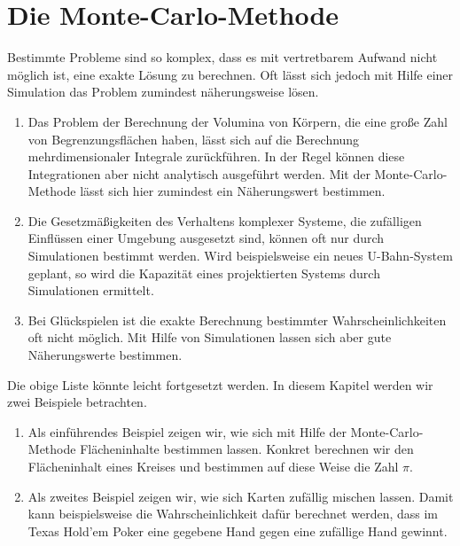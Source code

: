 \chapter[Monte-Carlo Method]{Die Monte-Carlo-Methode}
Bestimmte Probleme sind so komplex, dass es mit vertretbarem Aufwand nicht m\"oglich ist, eine exakte L\"osung zu
berechnen.  Oft l\"asst sich jedoch mit Hilfe einer Simulation das Problem zumindest n\"aherungsweise l\"osen.  
\begin{enumerate}
\item Das Problem der Berechnung der Volumina von K\"orpern, die eine gro{\ss}e Zahl von Begrenzungsfl\"achen haben,
      l\"asst sich auf die Berechnung mehrdimensionaler Integrale zur\"uckf\"uhren.  In der Regel k\"onnen diese
      Integrationen aber nicht analytisch ausgef\"uhrt werden.   Mit der Monte-Carlo-Methode l\"asst sich hier
      zumindest ein N\"aherungswert bestimmen.
\item Die Gesetzm\"a{\ss}igkeiten des Verhaltens komplexer Systeme, die zuf\"alligen Ein\-fl\"ussen einer Umgebung
      ausgesetzt sind, k\"onnen oft nur durch Simulationen bestimmt werden.  Wird beispielsweise ein neues
      U-Bahn-System geplant, so wird die Kapazit\"at eines projektierten Systems durch Simulationen ermittelt.
\item Bei Gl\"uckspielen ist die exakte Berechnung bestimmter Wahrscheinlichkeiten oft nicht m\"oglich.
      Mit Hilfe von Simulationen lassen sich aber gute N\"aherungs\-werte bestimmen.  
\end{enumerate}
Die obige Liste k\"onnte leicht fortgesetzt werden.  In diesem Kapitel werden wir zwei Beispiele betrachten.
\begin{enumerate}
\item Als einf\"uhrendes Beispiel zeigen wir, wie sich mit Hilfe der Monte-Carlo-Methode Fl\"acheninhalte bestimmen
      lassen.  Konkret berechnen wir den Fl\"a\-cheninhalt eines Kreises und bestimmen auf diese Weise
      die Zahl $\pi$.
\item Als zweites Beispiel zeigen wir, wie sich Karten zuf\"allig mischen lassen.
      Damit kann beispielsweise die Wahrscheinlichkeit daf\"ur berechnet werden, dass im Texas Hold'em Poker eine
      gegebene Hand gegen eine zuf\"allige Hand gewinnt.
\end{enumerate}

